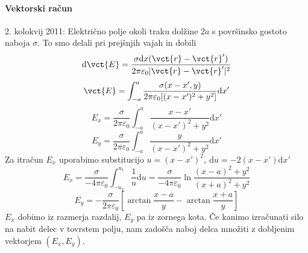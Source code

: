 \documentclass[a4paper]{article}
\newcommand{\dif}{\mathrm{d}}
\begin{document}
\paragraph{Vektorski račun}
2. kolokvij 2011:
Električno polje okoli traku dolžine $2a$ s površinsko gostoto naboja $\sigma$.
To smo delali pri prejšnjih vajah in dobili $$\mathrm{d} \vct{E} = \frac{\sigma \mathrm{d}x (\vct{r} - \vct{r}')}{2\pi\varepsilon_0|\vct{r} - \vct{r}'|^2}$$
$$\vct{E} = \int_{-a}^{a}\frac{\sigma(x - x', y)}{2\pi\varepsilon_0[(x-x')^2 + y^2]}\mathrm{d}x'$$
$$E_x = \frac{\sigma}{2\pi\varepsilon_0}\int_{-a}^{a} \frac{x - x'}{(x - x')^2 + y^2} \dif x'$$
$$E_y = \frac{\sigma}{2\pi\varepsilon_0}\int_{-a}^{a} \frac{y}{(x - x')^2 + y^2} \dif x'$$
Za itračun $E_x$ uporabimo substitucijo $u = (x - x')^2,~\dif u = -2(x - x')\dif x'$
$$E_x = \frac{\sigma}{-4\pi\varepsilon_0}\int_{-u_2}^{u_1}\frac{1}{u}\dif u = \frac{\sigma}{-4\pi\varepsilon_0}\ln\frac{(x-a)^2 + y^2}{(x + a)^2 + y^2}$$
$$E_y = -\frac{\sigma}{2\pi\varepsilon_0}\left[\arctan\frac{x-a}{y} - \arctan\frac{x+a}{y}\right]$$
$E_x$ dobimo iz razmerja razdalij, $E_y$ pa iz zornega kota. Če kanimo izračunati silo na nabit delec v tovrstem polju, nam zadošča naboj delca množiti z dobljenim vektorjem $(E_x, E_y)$. \\
\end{document}
